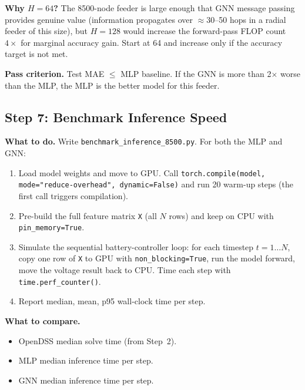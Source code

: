 \documentclass[11pt]{article}
\begin{document}
\noindent\textbf{Why $H=64$?}  The 8500-node feeder is large enough that
GNN message passing provides genuine value (information propagates over
${\approx}30$--50 hops in a radial feeder of this size), but $H=128$ would
increase the forward-pass FLOP count $4\times$ for marginal accuracy gain.
Start at 64 and increase only if the accuracy target is not met.

\noindent\textbf{Pass criterion.}
Test MAE $\leq$ MLP baseline.  If the GNN is more than 2$\times$ worse than
the MLP, the MLP is the better model for this feeder.

\subsection{Step 7: Benchmark Inference Speed}
\label{subsec:step7}

\noindent\textbf{What to do.}
Write \texttt{benchmark\_inference\_8500.py}.  For both the MLP and GNN:

\begin{enumerate}[itemsep=2pt]
  \item Load model weights and move to GPU.  Call
    \texttt{torch.compile(model, mode="reduce-overhead", dynamic=False)}
    and run 20 warm-up steps (the first call triggers compilation).
  \item Pre-build the full feature matrix \texttt{X} (all $N$ rows) and keep
    on CPU with \texttt{pin\_memory=True}.
  \item Simulate the sequential battery-controller loop:
    for each timestep $t = 1 \ldots N$, copy one row of \texttt{X} to GPU
    with \texttt{non\_blocking=True}, run the model forward, move the voltage
    result back to CPU.  Time each step with \texttt{time.perf\_counter()}.
  \item Report median, mean, p95 wall-clock time per step.
\end{enumerate}

\noindent\textbf{What to compare.}
\begin{itemize}
  \item OpenDSS median solve time (from Step~2).
  \item MLP median inference time per step.
  \item GNN median inference time per step.
\end{itemize}
\end{document}
